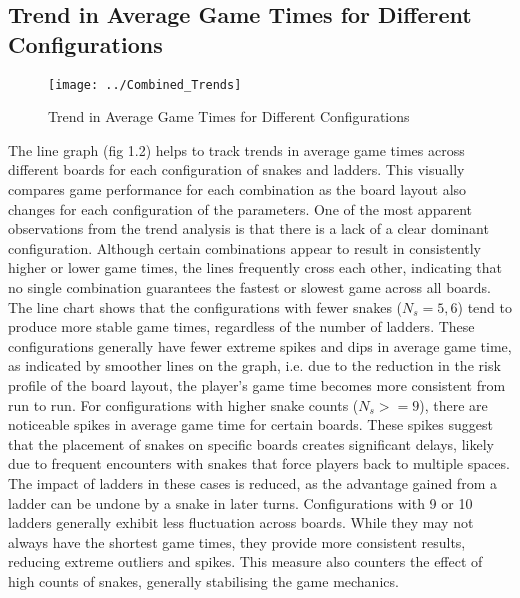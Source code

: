 \documentclass[12pt]{report}
\begin{document}
	\subsection{Trend in Average Game Times for Different Configurations}
		\begin{figure}[h]
			\centering
			\texttt{[image: ../Combined\_Trends]}
			\caption{Trend in Average Game Times for Different Configurations}
			\label{fig:TrendLine}
		\end{figure}
	The line graph (fig 1.2) helps to track trends in average game times across different boards for each configuration of snakes and ladders. This visually compares game performance for each combination as the board layout also changes for each configuration of the parameters. One of the most apparent observations from the trend analysis is that there is a lack of a clear dominant configuration. Although certain combinations appear to result in consistently higher or lower game times, the lines frequently cross each other, indicating that no single combination guarantees the fastest or slowest game across all boards. The line chart shows that the configurations with fewer snakes ($N_{s} = 5, 6$) tend to produce more stable game times, regardless of the number of ladders. These configurations generally have fewer extreme spikes and dips in average game time, as indicated by smoother lines on the graph, i.e. due to the reduction in the risk profile of the board layout, the player’s game time becomes more consistent from run to run. For configurations with higher snake counts ($N_{s} >= 9$), there are noticeable spikes in average game time for certain boards. These spikes suggest that the placement of snakes on specific boards creates significant delays, likely due to frequent encounters with snakes that force players back to multiple spaces. The impact of ladders in these cases is reduced, as the advantage gained from a ladder can be undone by a snake in later turns. Configurations with 9 or 10 ladders generally exhibit less fluctuation across boards. While they may not always have the shortest game times, they provide more consistent results, reducing extreme outliers and spikes. This measure also counters the effect of high counts of snakes, generally stabilising the game mechanics.
	
\end{document}
